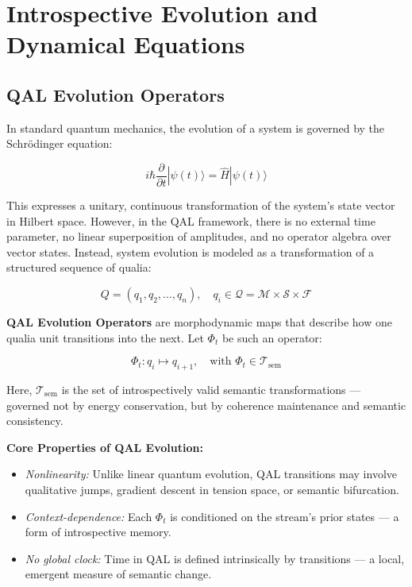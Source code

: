 \documentclass[11pt]{article}
\numberwithin{equation}{section} %
\begin{document}
\section{Introspective Evolution and Dynamical Equations}

\subsection{QAL Evolution Operators}

In standard quantum mechanics, the evolution of a system is governed by the Schrödinger equation:

\begin{equation}
i\hbar \frac{\partial}{\partial t} |\psi(t)\rangle = \hat{H} |\psi(t)\rangle
\end{equation}

This expresses a unitary, continuous transformation of the system’s state vector in Hilbert space. However, in the QAL framework, there is no external time parameter, no linear superposition of amplitudes, and no operator algebra over vector states. Instead, system evolution is modeled as a transformation of a structured sequence of qualia:

\begin{equation}
Q = (q_1, q_2, ..., q_n), \quad q_i \in \mathcal{Q} = \mathcal{M} \times \mathcal{S} \times \mathcal{F}
\end{equation}

\textbf{QAL Evolution Operators} are morphodynamic maps that describe how one qualia unit transitions into the next. Let \( \Phi_t \) be such an operator:

\begin{equation}
\Phi_t: q_i \mapsto q_{i+1}, \quad \text{with } \Phi_t \in \mathcal{T}_{\text{sem}}
\end{equation}

Here, \( \mathcal{T}_{\text{sem}} \) is the set of introspectively valid semantic transformations — governed not by energy conservation, but by coherence maintenance and semantic consistency.

\bigskip

\noindent\textbf{Core Properties of QAL Evolution:}
\begin{itemize}
  \item \textit{Nonlinearity:} Unlike linear quantum evolution, QAL transitions may involve qualitative jumps, gradient descent in tension space, or semantic bifurcation.
  \item \textit{Context-dependence:} Each \( \Phi_t \) is conditioned on the stream’s prior states — a form of introspective memory.
  \item \textit{No global clock:} Time in QAL is defined intrinsically by transitions — a local, emergent measure of semantic change.
\end{itemize}
\end{document}
